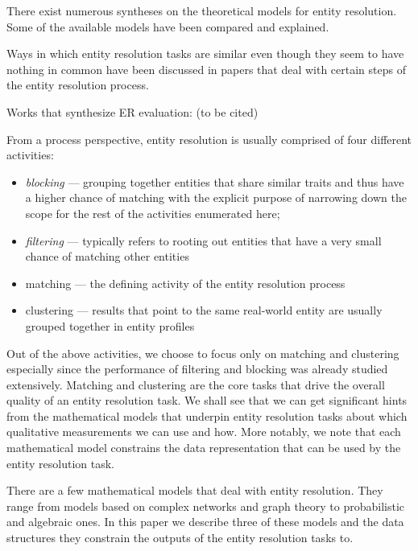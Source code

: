 \documentclass[11pt]{article}
\begin{document}
    There exist numerous syntheses on the theoretical models for entity
    resolution\cite{fs1969,Ben2009Swoosh,Tal11}.
    Some of the available models have been compared and
    explained\cite{Tal11,tal2013}.

    Ways in which entity resolution tasks are similar even though they seem
    to have nothing in common have been discussed in papers that deal with
    certain steps of the entity resolution process\cite{Pap19,Chen09}.

    Works that synthesize ER evaluation: (to be cited)

    From a process perspective, entity resolution is usually comprised of four
    different activities\cite{Pap19,Tal11}:
    \begin{itemize}
        \item \textit{blocking} --- grouping together entities that share
        similar traits and thus have a higher chance of matching with the
        explicit purpose of narrowing down the scope for the rest of the
        activities enumerated here;
        \item \textit{filtering} --- typically refers to rooting out entities
        that have a very small chance of matching other entities
        \item matching --- the defining activity of the entity resolution
        process
        \item clustering --- results that point to the same real-world entity
        are usually grouped together in entity profiles
    \end{itemize}

    Out of the above activities, we choose to focus only on matching and
    clustering especially since the performance of filtering and blocking was
    already studied extensively\cite{Pap19}.
    Matching and clustering are the core tasks that drive the overall quality of
    an entity resolution task.
    We shall see that we can get significant hints from the mathematical models
    that underpin entity resolution tasks about which qualitative measurements
    we can use and how.
    More notably, we note that each mathematical model constrains the data
    representation that can be used by the entity resolution task.

    There are a few mathematical models that deal with entity resolution.
    They range from models based on complex networks and graph
    theory\cite{Li2020} to probabilistic and algebraic ones.
    In this paper we describe three of these models and the data structures they
    constrain the outputs of the entity resolution tasks to.
\end{document}
